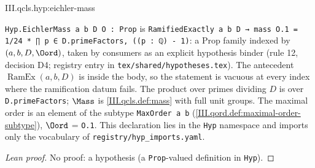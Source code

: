 \begin{hypothesis}
\end{hypothesis}
\begin{tfformal}{III.qcls.hyp:eichler-mass}
\begin{tffidelity}
\texttt{Hyp.EichlerMass a b D O : Prop} is \texttt{RamifiedExactly a b D → mass O.1 = 1/24 * ∏ p ∈ D.primeFactors, ((p : ℚ) - 1)}: a Prop family indexed by $(a,b,D,\Oord)$, taken by consumers as an explicit hypothesis binder (rule 12, decision D4; registry entry in \texttt{tex/shared/hypotheses.tex}). The antecedent $\operatorname{RamEx}(a,b,D)$ is inside the body, so the statement is vacuous at every index where the ramification datum fails. The product over primes dividing $D$ is over \texttt{D.primeFactors}; $\Mass$ is \cref{III.qcls.def:mass} with full unit groups. The maximal order is an element of the subtype \texttt{MaxOrder a b} (\cref{III.qord.def:maximal-order-subtype}), $\Oord$ = \texttt{O.1}. This declaration lies in the \texttt{Hyp} namespace and imports only the vocabulary of \texttt{registry/hyp\_imports.yaml}.
\end{tffidelity}
\end{tfformal}
\begin{proof}[Lean proof]
No proof: a hypothesis (a \texttt{Prop}-valued definition in \texttt{Hyp}).
\end{proof}

